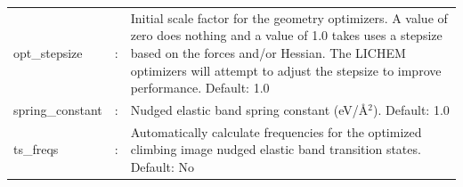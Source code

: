 \documentclass[12pt]{report}
\begin{document}
\begin{center}
\begin{longtable}{ p{4cm} c p{12.5cm}}
\\


opt\_stepsize & : & Initial scale factor for the geometry optimizers.
A value of zero does nothing and a value of 1.0 takes uses a stepsize based
on the forces and/or Hessian. The LICHEM optimizers will attempt to adjust
the stepsize to improve performance.
Default: 1.0 \newline\\

spring\_constant & : & Nudged elastic band spring constant (eV/\AA$^2$).
Default: 1.0 \newline\\

ts\_freqs & : & Automatically calculate frequencies for the optimized climbing
image nudged elastic band transition states.
Default: No 
\end{longtable}
\end{center}
\vspace{-48pt}
\end{document}

